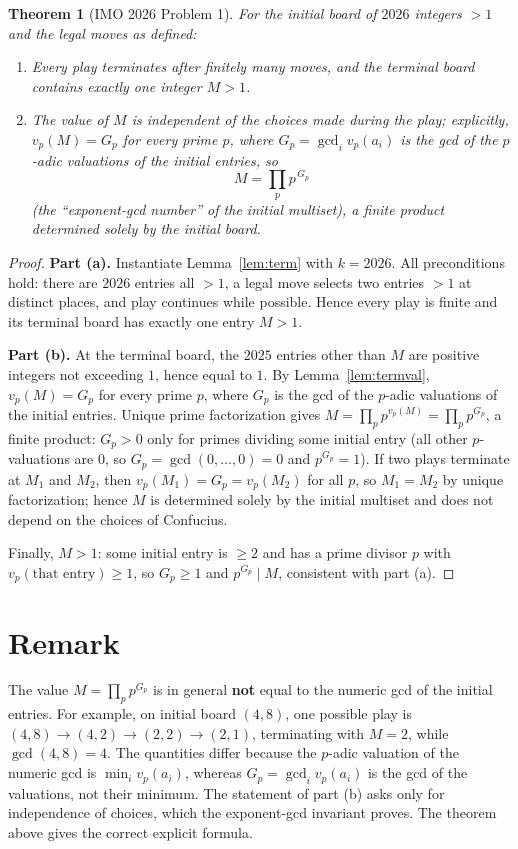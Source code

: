 \documentclass{article}
\newtheorem{theorem}{Theorem}
\begin{document}
\begin{theorem}[IMO 2026 Problem 1]
For the initial board of $2026$ integers ${}>1$ and the legal moves as defined:
\begin{enumerate}
\item[(a)] Every play terminates after finitely many moves, and the terminal board
           contains exactly one integer $M>1$.
\item[(b)] The value of $M$ is independent of the choices made during the play; explicitly,
           $v_p(M)=G_p$ for every prime $p$, where $G_p=\gcd_i v_p(a_i)$ is the gcd of the
           $p$-adic valuations of the initial entries, so
           \[
           M=\prod_{p} p^{\,G_p}
           \]
           (the ``exponent-gcd number'' of the initial multiset), a finite product
           determined solely by the initial board.
\end{enumerate}
\end{theorem}
\begin{proof}
\textbf{Part (a).} Instantiate Lemma~\ref{lem:term} with $k=2026$. All preconditions hold:
there are $2026$ entries all $>1$, a legal move selects two entries $>1$ at distinct places,
and play continues while possible. Hence every play is finite and its terminal board has
exactly one entry $M>1$.

\textbf{Part (b).} At the terminal board, the $2025$ entries other than $M$ are positive
integers not exceeding $1$, hence equal to $1$. By Lemma~\ref{lem:termval},
$v_p(M)=G_p$ for every prime $p$, where $G_p$ is the gcd of the $p$-adic valuations of the
initial entries. Unique prime factorization gives
$M=\prod_p p^{v_p(M)}=\prod_p p^{G_p}$, a finite product: $G_p>0$ only for primes dividing
some initial entry (all other $p$-valuations are $0$, so $G_p=\gcd(0,\dots,0)=0$ and
$p^{G_p}=1$). If two plays terminate at $M_1$ and $M_2$, then $v_p(M_1)=G_p=v_p(M_2)$ for all
$p$, so $M_1=M_2$ by unique factorization; hence $M$ is determined solely by the initial
multiset and does not depend on the choices of Confucius.

Finally, $M>1$: some initial entry is $\geq 2$ and has a prime divisor $p$ with
$v_p(\text{that entry})\geq 1$, so $G_p\geq 1$ and $p^{G_p}\mid M$, consistent with part (a).
\end{proof}

\section*{Remark}

The value $M=\prod_p p^{G_p}$ is in general \textbf{not} equal to the numeric gcd of the
initial entries. For example, on initial board $(4,8)$, one possible play is
$(4,8)\to(4,2)\to(2,2)\to(2,1)$, terminating with $M=2$, while $\gcd(4,8)=4$. The quantities
differ because the $p$-adic valuation of the numeric gcd is $\min_i v_p(a_i)$, whereas
$G_p=\gcd_i v_p(a_i)$ is the gcd of the valuations, not their minimum. The statement of part
(b) asks only for independence of choices, which the exponent-gcd invariant proves. The
theorem above gives the correct explicit formula.
\end{document}
